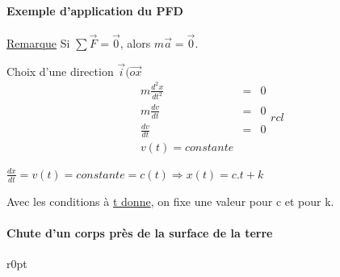 \paragraph{Exemple d'application du PFD} 

\ul{Remarque} Si $\sum \vec{F}=\vec{0}$, alors $m\vec{a}=\vec{0}$.

Choix d'une direction $\vec{i} (\overrightarrow{ox}$ \[\begin{array}{rcl}
	m\frac{d^2x}{dt^2} &=& 0 \\
	m\frac{dv}{dt} &=& 0 \\
	\frac{dv}{dt} &=& 0 \\
v(t) = constante \end{array}{rcl} \]

$\frac{dx}{dt} = v(t) = constante = c(t) \Rightarrow x(t) = c.t + k$

Avec les conditions à \ul{t donne}, on fixe une valeur pour c et pour k.

\paragraph{Chute d'un corps près de la surface de la terre}

\begin{wrapfigure}[5]{r}{0pt}
\end{wrapfigure}

